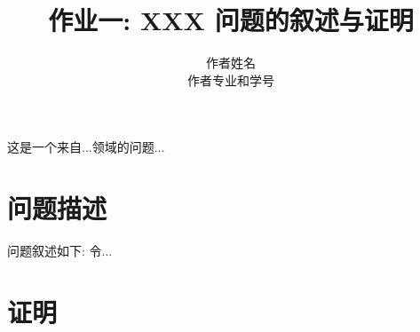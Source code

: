 \documentclass{ctexart}
\title{作业一: XXX 问题的叙述与证明}
\author{作者姓名 \\ 作者专业和学号}
\begin{document}
\maketitle


这是一个来自...领域的问题...
\section{问题描述}
问题叙述如下: 令...

\section{证明}
\end{document}
